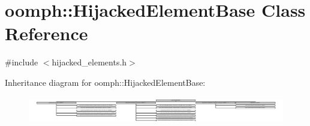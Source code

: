 \hypertarget{classoomph_1_1HijackedElementBase}{}\section{oomph\+:\+:Hijacked\+Element\+Base Class Reference}
\label{classoomph_1_1HijackedElementBase}


{\ttfamily \#include $<$hijacked\+\_\+elements.\+h$>$}

Inheritance diagram for oomph\+:\+:Hijacked\+Element\+Base\+:\begin{figure}[H]
\begin{center}
\leavevmode
\includegraphics[height=1.191489cm]{classoomph_1_1HijackedElementBase}
\end{center}
\end{figure}
